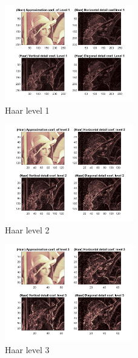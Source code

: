 \documentclass[12pt]{article}
\begin{document}
\begin{enumerate}[leftmargin=\labelsep]
\begin{enumerate}
    \begin{figure}[H]
        \centering
        \includegraphics[width=0.5\textwidth,height=0.5\textwidth]{Figures/Haar1.png}
        \caption{Haar level 1}
        \label{Q4_a_level1}
    \end{figure}
    \begin{figure}[H]
        \centering
        \includegraphics[width=0.5\textwidth,height=0.5\textwidth]{Figures/Haar2.png}
        \caption{Haar level 2}
        \label{Q4_a_level2}
    \end{figure}

    \begin{figure}[H]
        \centering
        \includegraphics[width=0.5\textwidth,height=0.5\textwidth]{Figures/Haar3.png}
        \caption{Haar level 3}
        \label{Q4_a_level3}
    \end{figure}
    

\end{enumerate}
\end{enumerate}
\end{document}
